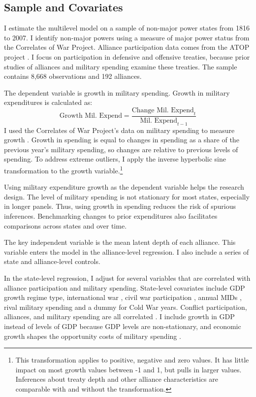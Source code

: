\documentclass[12pt]{article}
\begin{document}
\subsection{Sample and Covariates} 

I estimate the multilevel model on a sample of non-major power states from 1816 to 2007. 
I identify non-major powers using a measure of major power status from the Correlates of War Project. 
Alliance participation data comes from the ATOP project \citep{Leedsetal2002}.  
I focus on participation in defensive and offensive treaties, because prior studies of alliances and military spending examine these treaties. 
The sample contains 8,668 observations and 192 alliances. 


The dependent variable is growth in military spending.
Growth in military expenditures is calculated as:
\begin{equation}
\mbox{Growth Mil. Expend} = \frac{ \mbox{Change Mil. Expend}_t }{ \mbox{Mil. Expend}_{t-1} }
\end{equation} 
I used the Correlates of War Project's data on military spending to measure growth \citep{SingerCINC1988}. 
Growth in spending is equal to changes in spending as a share of the previous year's military spending, so changes are relative to previous levels of spending. 
To address extreme outliers, I apply the inverse hyperbolic sine transformation to the growth variable.\footnote{This transformation applies to positive, negative and zero values. It has little impact on most growth values between -1 and 1, but pulls in larger values. Inferences about treaty depth and other alliance characteristics are comparable with and without the transformation.}


Using military expenditure growth as the dependent variable helps the research design. 
The level of military spending is not stationary for most states, especially in longer panels. 
Thus, using growth in spending reduces the risk of spurious inferences.
Benchmarking changes to prior expenditures also facilitates comparisons across states and over time. 


The key independent variable is the mean latent depth of each alliance. 
This variable enters the model in the alliance-level regression. 
I also include a series of state and alliance-level controls. 


In the state-level regression, I adjust for several variables that are correlated with alliance participation and military spending. 
State-level covariates include GDP growth \citep{Boltetal2018} regime type, international war \cite{Reiteretal2016}, civil war participation \citep{SarkeesWayman2010}, annual MIDs \citep{Gibleretal2016}, rival military spending \citep{ThompsonDreyer2012} and a dummy for Cold War years.
Conflict participation, alliances, and military spending are all correlated \citep{SeneseVasquez2008}.
I include growth in GDP instead of levels of GDP because GDP levels are non-stationary, and economic growth shapes the opportunity costs of military spending \citep{Kimball2010, Zielinskietal2017}.  
\end{document}
